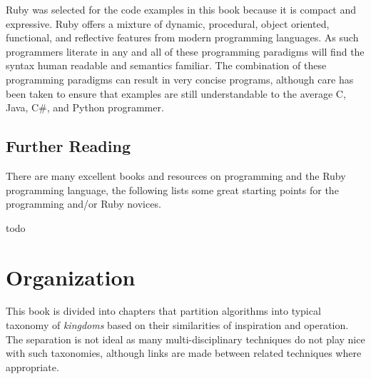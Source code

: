 Ruby was selected for the code examples in this book because it is compact and expressive. Ruby offers a mixture of dynamic, procedural, object oriented, functional, and reflective features from modern programming languages. As such programmers literate in any and all of these programming paradigms will find the syntax human readable and semantics familiar. The combination of these programming paradigms can result in very concise programs, although care has been taken to ensure that examples are still understandable to the average C, Java, C\#, and Python programmer.

\subsection{Further Reading}
There are many excellent books and resources on programming and the Ruby programming language, the following lists some great starting points for the programming and/or Ruby novices.

todo

\section{Organization}
This book is divided into chapters that partition algorithms into typical taxonomy of \emph{kingdoms} based on their similarities of inspiration and operation. The separation is not ideal as many multi-disciplinary techniques do not play nice with such taxonomies, although links are made between related techniques where appropriate.
